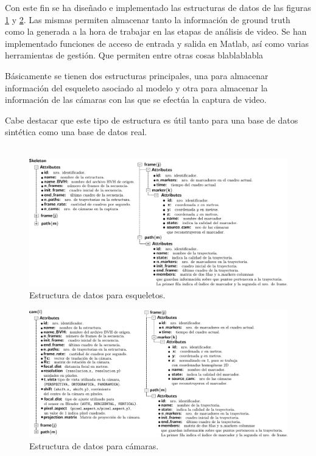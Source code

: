 Con este fin se ha diseñado e implementado las estructuras de datos de las figuras \ref{img_estructura_skeleton} y \ref{img_estructura_cam}.
Las mismas permiten almacenar tanto la información de ground truth como la generada a la hora de  trabajar en las etapas de análisis de video. Se han implementado funciones de acceso de entrada y salida en Matlab, así como varias herramientas de gestión. Que permiten entre otras cosas blablablabla


Básicamente se tienen dos estructuras principales, una para almacenar información del esqueleto asociado al modelo y otra para almacenar la información de las cámaras con las que se efectúa la captura de video.

Cabe destacar que este tipo de estructura es útil tanto para una base de datos sintética como una base de datos real. \\
\\

\begin{figure}[H]
   \centering 
   \includegraphics[scale=0.6]{img/Base_Datos/Estructura_datos_skeleton.pdf}
   \caption{Estructura de datos para esqueletos.}  
   \label{img_estructura_skeleton} 
 \end{figure} 

\begin{figure}[H]
   \centering 
   \includegraphics[scale=0.6]{img/Base_Datos/Estructura_datos_cam.pdf}
   \caption{Estructura de datos para cámaras.}
   \label{img_estructura_cam}    
 \end{figure} 

